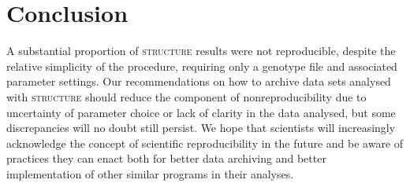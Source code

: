 \section{Conclusion}
A substantial proportion of \textsc{structure} results were not reproducible, despite the relative simplicity of the procedure, requiring only a genotype file and associated parameter settings. Our recommendations on how to archive data sets analysed with \textsc{structure} should reduce the component of nonreproducibility due to uncertainty of parameter choice or lack of clarity in the data analysed, but some discrepancies will no doubt still persist. We hope that scientists will increasingly acknowledge the concept of scientific reproducibility in the future and be aware of practices they can enact both for better data archiving and better implementation of other similar programs in their analyses.

